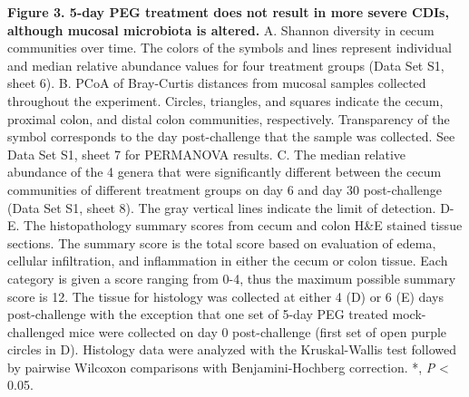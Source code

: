 \documentclass[
  11pt,
]{article}
\begin{document}
\textbf{Figure 3. 5-day PEG treatment does not result in more severe
CDIs, although mucosal microbiota is altered.} A. Shannon diversity in
cecum communities over time. The colors of the symbols and lines
represent individual and median relative abundance values for four
treatment groups (Data Set S1, sheet 6). B. PCoA of Bray-Curtis
distances from mucosal samples collected throughout the experiment.
Circles, triangles, and squares indicate the cecum, proximal colon, and
distal colon communities, respectively. Transparency of the symbol
corresponds to the day post-challenge that the sample was collected. See
Data Set S1, sheet 7 for PERMANOVA results. C. The median relative
abundance of the 4 genera that were significantly different between the
cecum communities of different treatment groups on day 6 and day 30
post-challenge (Data Set S1, sheet 8). The gray vertical lines indicate
the limit of detection. D-E. The histopathology summary scores from
cecum and colon H\&E stained tissue sections. The summary score is the
total score based on evaluation of edema, cellular infiltration, and
inflammation in either the cecum or colon tissue. Each category is given
a score ranging from 0-4, thus the maximum possible summary score is 12.
The tissue for histology was collected at either 4 (D) or 6 (E) days
post-challenge with the exception that one set of 5-day PEG treated
mock-challenged mice were collected on day 0 post-challenge (first set
of open purple circles in D). Histology data were analyzed with the
Kruskal-Wallis test followed by pairwise Wilcoxon comparisons with
Benjamini-Hochberg correction. *, \emph{P} \textless{} 0.05. \newpage
\end{document}
